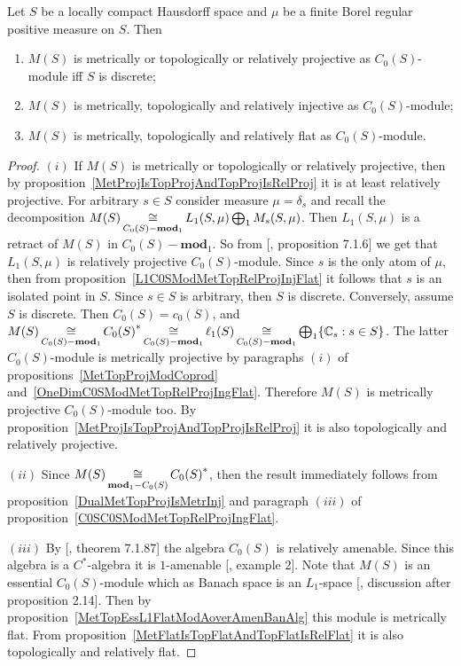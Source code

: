 \begin{proposition}\label{MSC0SModMetTopRelProjIngFlat} Let $S$ be a locally
compact Hausdorff space and $\mu$ be a finite Borel regular positive measure on
$S$. Then

\begin{enumerate}[label = (\roman*)]
    \item $M(S)$ is metrically or topologically or relatively projective as
    $C_0(S)$-module iff $S$ is discrete; 

    \item $M(S)$ is metrically, topologically and relatively injective as
    $C_0(S)$-module; 

    \item $M(S)$ is metrically, topologically and relatively flat as
    $C_0(S)$-module.
\end{enumerate}
\end{proposition}
\begin{proof} $(i)$ If $M(S)$ is metrically or topologically or relatively
projective, then by proposition~\ref{MetProjIsTopProjAndTopProjIsRelProj} it is
at least relatively projective. For arbitrary $s\in S$ consider measure
$\mu=\delta_s$ and recall the decomposition
$M(S)\mathop{\mathbin{\cong}}\limits_{C_0(S)-\mathbf{mod}_1}L_1(S,\mu)\bigoplus_1 M_s(S,\mu)$. Then
$L_1(S,\mu)$ is a retract of $M(S)$ in $C_0(S)-\mathbf{mod}_1$. So from
[\cite{HelBanLocConvAlg}, proposition 7.1.6] we get that $L_1(S,\mu)$ is
relatively projective $C_0(S)$-module. Since $s$ is the only atom of $\mu$, then
from proposition~\ref{L1C0SModMetTopRelProjInjFlat} it follows that $s$ is an
isolated point in $S$. Since $s\in S$ is arbitrary, then $S$ is discrete.
Conversely, assume $S$ is discrete. Then $C_0(S)=c_0(S)$, and
$M(S)
\mathop{\mathbin{\cong}}\limits_{C_0(S)-\mathbf{mod}_1}{C_0(S)}^*
\mathop{\mathbin{\cong}}\limits_{C_0(S)-\mathbf{mod}_1}\ell_1(S)
\mathop{\mathbin{\cong}}\limits_{C_0(S)-\mathbf{mod}_1}
\bigoplus_1 \{\mathbb{C}_s:s\in S \}$. The latter $C_0(S)$-module is metrically
projective by paragraphs $(i)$ of propositions~\ref{MetTopProjModCoprod}
and~\ref{OneDimC0SModMetTopRelProjIngFlat}. Therefore $M(S)$ is metrically
projective $C_0(S)$-module too. By
proposition~\ref{MetProjIsTopProjAndTopProjIsRelProj} it is also topologically
and relatively projective.

$(ii)$ Since $M(S)\mathop{\mathbin{\cong}}\limits_{\mathbf{mod}_1-C_0(S)}{C_0(S)}^*$, then the result
immediately follows from proposition~\ref{DualMetTopProjIsMetrInj} and paragraph
$(iii)$ of proposition~\ref{C0SC0SModMetTopRelProjIngFlat}.

$(iii)$ By [\cite{HelBanLocConvAlg}, theorem 7.1.87] the algebra $C_0(S)$ is
relatively amenable. Since this algebra is a $C^*$-algebra it is $1$-amenable
[\cite{RundeAmenConstFour}, example 2]. Note that $M(S)$ is an essential
$C_0(S)$-module which as Banach space is an $L_1$-space
[\cite{DalLauSecondDualOfMeasAlg}, discussion after proposition 2.14]. Then by
proposition~\ref{MetTopEssL1FlatModAoverAmenBanAlg} this module is metrically
flat. From proposition~\ref{MetFlatIsTopFlatAndTopFlatIsRelFlat} it is also
topologically and relatively flat.
\end{proof}

